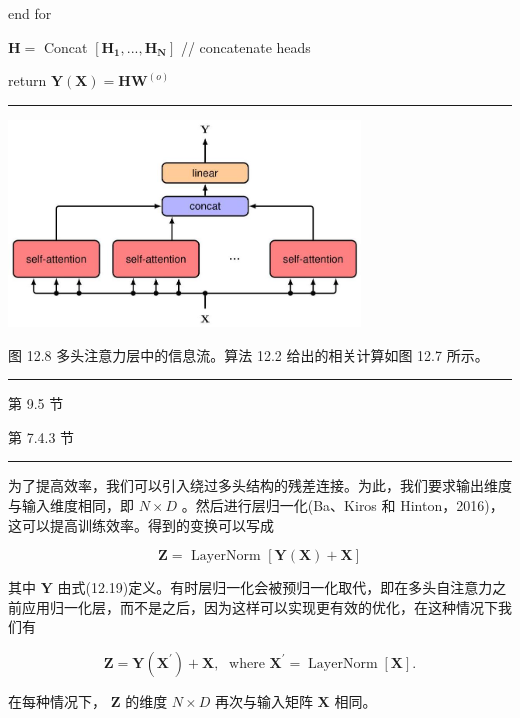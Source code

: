 \documentclass[10pt]{report}
\newcommand{\HRule}{\begin{center}\rule{0.9\linewidth}{0.2mm}\end{center}}
\begin{document}
end for

\(\mathbf{H} =\) Concat \(\left\lbrack  {\mathbf{{H}_{1}},...,\mathbf{{H}_{N}}}\right\rbrack\) // concatenate heads

return \(\mathbf{Y}\left( \mathbf{X}\right)  = \mathbf{H}{\mathbf{W}}^{\left( o\right) }\)

\HRule

\begin{center}
\includegraphics[max width=0.7\textwidth]{images/0194e279-9b28-703a-88f4-c3ac21e2010d_388_580_353_909_534_0.jpg}
\end{center}
\hspace*{3em} 

图 12.8 多头注意力层中的信息流。算法 12.2 给出的相关计算如图 12.7 所示。

\HRule

第 9.5 节

第 7.4.3 节

\HRule

为了提高效率，我们可以引入绕过多头结构的残差连接。为此，我们要求输出维度与输入维度相同，即 \(N \times  D\) 。然后进行层归一化(Ba、Kiros 和 Hinton，2016)，这可以提高训练效率。得到的变换可以写成

\[
\mathbf{Z} = \text{ LayerNorm }\left\lbrack  {\mathbf{Y}\left( \mathbf{X}\right)  + \mathbf{X}}\right\rbrack   \tag{12.20}
\]

其中 \(\mathbf{Y}\) 由式(12.19)定义。有时层归一化会被预归一化取代，即在多头自注意力之前应用归一化层，而不是之后，因为这样可以实现更有效的优化，在这种情况下我们有

\[
\mathbf{Z} = \mathbf{Y}\left( {\mathbf{X}}^{\prime }\right)  + \mathbf{X},\;\text{ where }{\mathbf{X}}^{\prime } = \operatorname{LayerNorm}\left\lbrack  \mathbf{X}\right\rbrack  . \tag{12.21}
\]

在每种情况下， \(\mathbf{Z}\) 的维度 \(N \times  D\) 再次与输入矩阵 \(\mathbf{X}\) 相同。
\end{document}
